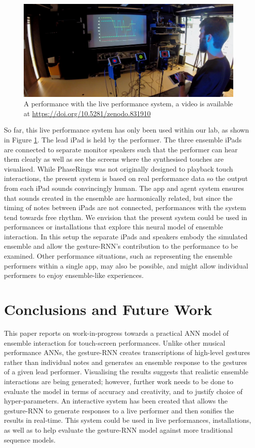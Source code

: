 \documentclass[sigchi]{acmart} %
\begin{document}
\begin{figure}
  \centering
  \includegraphics[width=\columnwidth]{neural-ipad-band-demo.jpg}
  \caption{A performance with the live performance system, a video is
    available at
    \url{https://doi.org/10.5281/zenodo.831910}}\label{fig:live-system-demo}
\end{figure}

So far, this live performance system has only been used within our lab,
as shown in Figure \ref{fig:live-system-demo}. The lead iPad is held
by the performer. The three ensemble iPads are connected to separate
monitor speakers such that the performer can hear them clearly as well
as see the screens where the synthesised touches are visualised. While
PhaseRings was not originally designed to playback touch interactions,
the present system is based on real performance data so the output
from each iPad sounds convincingly human. The app and agent system
ensures that sounds created in the ensemble are harmonically related,
but since the timing of notes between iPads are not connected,
performances with the system tend towards free rhythm. We envision
that the present system could be used in performances or installations
that explore this neural model of ensemble interaction. In this setup
the separate iPads and speakers embody the simulated ensemble and
allow the gesture-RNN's contribution to the performance to be
examined. Other performance situations, such as representing the
ensemble performers within a single app, may also be possible, and
might allow individual performers to enjoy ensemble-like experiences.

\section{Conclusions and Future Work}

This paper reports on work-in-progress towards a practical ANN model
of ensemble interaction for touch-screen performances. Unlike other
musical performance ANNs, the gesture-RNN creates transcriptions of
high-level gestures rather than individual notes and generates an
ensemble response to the gestures of a given lead performer.
Visualising the results suggests that realistic ensemble interactions
are being generated; however, further work needs to be done to
evaluate the model in terms of accuracy and creativity, and to justify
choice of hyper-parameters. An interactive system has been created
that allows the gesture-RNN to generate responses to a live performer
and then sonifies the results in real-time. This system could be used
in live performances, installations, as well as to help evaluate the
gesture-RNN model against more traditional sequence models.
\end{document}
